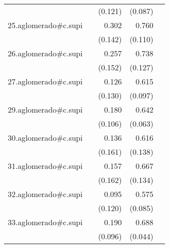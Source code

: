 {\begin{longtable}{l*{4}{D{.}{.}{-1}}}
            &                     &     (0.121)         &     (0.087)         &                     \\
\addlinespace
25.aglomerado#c.supi&                     &       0.302\sym{*}  &       0.760\sym{***}&                     \\
            &                     &     (0.142)         &     (0.110)         &                     \\
\addlinespace
26.aglomerado#c.supi&                     &       0.257         &       0.738\sym{***}&                     \\
            &                     &     (0.152)         &     (0.127)         &                     \\
\addlinespace
27.aglomerado#c.supi&                     &       0.126         &       0.615\sym{***}&                     \\
            &                     &     (0.130)         &     (0.097)         &                     \\
\addlinespace
29.aglomerado#c.supi&                     &       0.180         &       0.642\sym{***}&                     \\
            &                     &     (0.106)         &     (0.063)         &                     \\
\addlinespace
30.aglomerado#c.supi&                     &       0.136         &       0.616\sym{***}&                     \\
            &                     &     (0.161)         &     (0.138)         &                     \\
\addlinespace
31.aglomerado#c.supi&                     &       0.157         &       0.667\sym{***}&                     \\
            &                     &     (0.162)         &     (0.134)         &                     \\
\addlinespace
32.aglomerado#c.supi&                     &       0.095         &       0.575\sym{***}&                     \\
            &                     &     (0.120)         &     (0.085)         &                     \\
\addlinespace
33.aglomerado#c.supi&                     &       0.190\sym{*}  &       0.688\sym{***}&                     \\
            &                     &     (0.096)         &     (0.044)         &                     \\

\end{longtable}}
